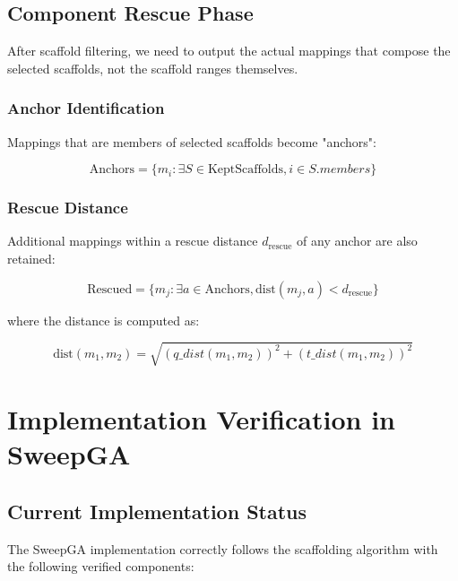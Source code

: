 \documentclass[11pt]{article}
\begin{document}
\subsection{Component Rescue Phase}

After scaffold filtering, we need to output the actual mappings that compose the selected scaffolds, not the scaffold ranges themselves.

\subsubsection{Anchor Identification}

Mappings that are members of selected scaffolds become "anchors":

\begin{equation}
\text{Anchors} = \{m_i : \exists S \in \text{KeptScaffolds}, i \in S.members\}
\end{equation}

\subsubsection{Rescue Distance}

Additional mappings within a rescue distance $d_{\text{rescue}}$ of any anchor are also retained:

\begin{equation}
\text{Rescued} = \{m_j : \exists a \in \text{Anchors}, \text{dist}(m_j, a) < d_{\text{rescue}}\}
\end{equation}

where the distance is computed as:

\begin{equation}
\text{dist}(m_1, m_2) = \sqrt{(q\_dist(m_1, m_2))^2 + (t\_dist(m_1, m_2))^2}
\end{equation}

\section{Implementation Verification in SweepGA}

\subsection{Current Implementation Status}

The SweepGA implementation correctly follows the scaffolding algorithm with the following verified components:
\end{document}
